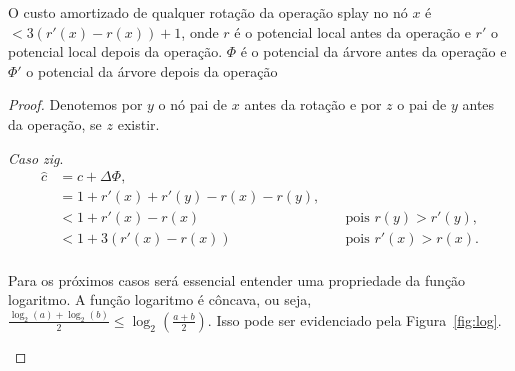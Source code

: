 \begin{lemma}
    O custo amortizado de qualquer rotação da operação splay no nó $x$ é $< 3(r'(x) - r(x)) + 1$, onde $r$ é o potencial local antes da operação e $r'$ o potencial local depois da operação. $\Phi$ é o potencial da árvore antes da operação e $\Phi'$ o potencial da árvore depois da operação
\end{lemma}

\begin{proof}
    Denotemos por $y$ o nó pai de $x$ antes da rotação e por $z$ o pai de $y$ antes da operação, se $z$ existir.

    \textit{Caso zig}.   
    \begin{align*}
        \hat{c} &= c + \Delta \Phi,\\
        &= 1 + r'(x) + r'(y) - r(x) - r(y), \quad & \text{}\\
        &< 1 + r'(x) - r(x) \quad & \text{pois $r(y) > r'(y)$},\\
        &< 1 + 3(r'(x) - r(x)) \quad & \text{pois $r'(x) > r(x)$}.\\
    \end{align*}

    Para os próximos casos será essencial entender uma propriedade da função logaritmo. A função logaritmo é côncava, ou seja, $\frac{\log_2(a) + \log_2(b)}{2} \leq \log_2(\frac{a+b}{2})$. Isso pode ser evidenciado pela Figura~\ref{fig:log}.

    \begin{figure}
\end{figure}
\end{proof}
